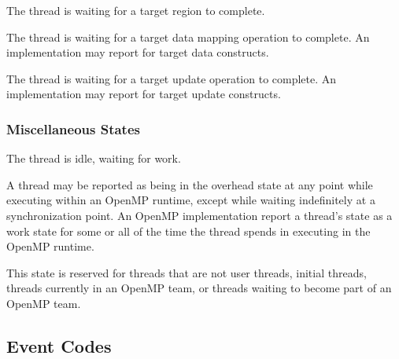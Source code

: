 \begin{description}

\item {} 

  The thread is waiting for a target region to complete.
  
\item {} 

  The thread is waiting for a target data mapping operation to complete. 
  An implementation may report  
  for target data constructs.

\item {} 

  The thread is waiting for a target  update operation to complete. 
  An implementation may report  
  for target update constructs.

\end{description}


\subsubsection{Miscellaneous States}

\begin{description}
\item {} 

  The thread is idle, waiting for work.

\item {} 

  A thread may be reported as being in the overhead state at any point while 
  executing within an OpenMP runtime, except while waiting indefinitely
  at a synchronization point.
  An OpenMP implementation report a thread's state as a work state for
  some or all of the time the thread spends in executing in the OpenMP runtime.

\item {} 

  This state is reserved for threads that are not user threads,
  initial threads, threads currently in an OpenMP team, or threads
  waiting to become part of an OpenMP team.

\end{description}

\subsection{Event Codes}
\label{sec:event-code}

